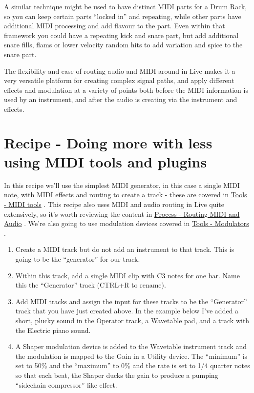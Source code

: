 \documentclass[
  12pt,
  letterpaper,
  oneside,
  open=any]{scrbook}
\begin{document}
A similar technique might be used to have distinct MIDI parts for a Drum
Rack, so you can keep certain parts ``locked in'' and repeating, while
other parts have additional MIDI processing and add flavour to the part.
Even within that framework you could have a repeating kick and snare
part, but add additional snare fills, flams or lower velocity random
hits to add variation and spice to the snare part.

The flexibility and ease of routing audio and MIDI around in Live makes
it a very versatile platform for creating complex signal paths, and
apply different effects and modulation at a variety of points both
before the MIDI information is used by an instrument, and after the
audio is creating via the instrument and effects.


\chapter{Recipe - Doing more with less using MIDI tools and
plugins}\label{006-Recipe-MIDI_tools}

In this recipe we'll use the simplest MIDI generator, in this case a
single MIDI note, with MIDI effects and routing to create a track -
these are covered in \hyperref[004-Tools-MIDI_tools]{Tools - MIDI tools}
. This recipe also uses MIDI and audio routing in Live quite
extensively, so it's worth reviewing the content in
\hyperref[005-Process-Routing]{Process - Routing MIDI and Audio} . We're
also going to use modulation devices covered in
\hyperref[007-Tools-Modulators]{Tools - Modulators} .

\begin{enumerate}
\def\labelenumi{\arabic{enumi}.}
\item
  Create a MIDI track but do not add an instrument to that track. This
  is going to be the ``generator'' for our track.
\item
  Within this track, add a single MIDI clip with C3 notes for one bar.
  Name this the ``Generator'' track (CTRL+R to rename).
\item
  Add MIDI tracks and assign the input for these tracks to be the
  ``Generator'' track that you have just created above. In the example
  below I've added a short, plucky sound in the Operator track, a
  Wavetable pad, and a track with the Electric piano sound.
\item
  A Shaper modulation device is added to the Wavetable instrument track
  and the modulation is mapped to the Gain in a Utility device. The
  ``minimum'' is set to 50\% and the ``maximum'' to 0\% and the rate is
  set to 1/4 quarter notes so that each beat, the Shaper ducks the gain
  to produce a pumping ``sidechain compressor'' like effect.
\end{enumerate}
\end{document}
